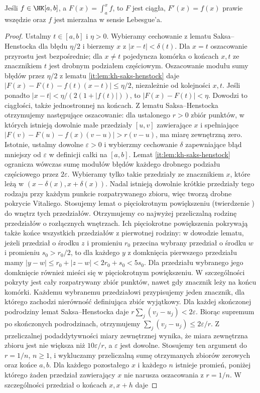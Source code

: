 \begin{twierdzenie}\label{ma1:kh:thm:kh-primitive-derivative}\label{it:thm:kh-primitive-derivative}
Jeśli $f\in\HK[a,b]$, a $F(x)=\int_a^x f$, to $F$ jest ciągła, $F'(x)=f(x)$ prawie wszędzie oraz $f$ jest mierzalna w sensie Lebesgue'a.
\end{twierdzenie}
\begin{proof}
Ustalmy $t\in[a,b]$ i $\eta>0$. Wybieramy cechowanie z lematu Saksa--Henstocka dla błędu $\eta/2$ i bierzemy $x$ z $|x-t|<\delta(t)$. Dla $x=t$ oszacowanie przyrostu jest bezpośrednie; dla $x\ne t$ pojedyncza komórka o końcach $x,t$ ze znacznikiem $t$ jest drobnym podziałem częściowym. Oszacowanie modułu sumy błędów przez $\eta/2$ z lematu \ref{it:lem:kh-saks-henstock} daje
$|F(x)-F(t)-f(t)(x-t)|\le\eta/2$, niezależnie od kolejności $x,t$. Jeśli ponadto $|x-t|<\eta/(2(1+|f(t)|))$, to $|F(x)-F(t)|<\eta$. Dowodzi to ciągłości, także jednostronnej na końcach. Z lematu Saksa--Henstocka otrzymujemy następujące oszacowanie: dla ustalonego $r>0$ zbiór punktów, w których istnieją dowolnie małe przedziały $[u,v]$ zawierające $x$ i spełniające $|F(v)-F(u)-f(x)(v-u)|>r(v-u)$, ma miarę zewnętrzną zero. Istotnie, ustalmy dowolne $\varepsilon>0$ i wybierzmy cechowanie $\delta$ zapewniające błąd mniejszy od $\varepsilon$ w definicji całki na $[a,b]$. Lemat \ref{it:lem:kh-saks-henstock} ogranicza wówczas sumę modułów błędów każdego drobnego podziału częściowego przez $2\varepsilon$. Wybieramy tylko takie przedziały ze znacznikiem $x$, które leżą w $(x-\delta(x),x+\delta(x))$. Nadal istnieją dowolnie krótkie przedziały tego rodzaju przy każdym punkcie rozpatrywanego zbioru, więc tworzą drobne pokrycie Vitaliego. Stosujemy lemat o pięciokrotnym powiększeniu (twierdzenie ) do wnętrz tych przedziałów. Otrzymujemy co najwyżej przeliczalną rodzinę przedziałów o rozłącznych wnętrzach. Ich pięciokrotne powiększenia pokrywają także końce wszystkich przedziałów z pierwotnej rodziny: w dowodzie lematu, jeżeli przedział o środku $z$ i promieniu $r_0$ przecina wybrany przedział o środku $w$ i promieniu $s_0>r_0/2$, to dla każdego $y$ z domknięcia pierwszego przedziału mamy $|y-w|\le r_0+|z-w|<2r_0+s_0<5s_0$. Dla przedziału wybranego jego domknięcie również mieści się w pięciokrotnym powiększeniu. W szczególności pokryty jest cały rozpatrywany zbiór punktów, nawet gdy znacznik leży na końcu komórki. Każdemu wybranemu przedziałowi przypisujemy jeden znacznik, dla którego zachodzi nierówność definiująca zbiór wyjątkowy. Dla każdej skończonej podrodziny lemat Saksa--Henstocka daje $r\sum_j(v_j-u_j)<2\varepsilon$. Biorąc supremum po skończonych podrodzinach, otrzymujemy $\sum_j(v_j-u_j)\le2\varepsilon/r$. Z przeliczalnej podaddytywności miary zewnętrznej wynika, że miara zewnętrzna zbioru jest nie większa niż $10\varepsilon/r$, a $\varepsilon$ jest dowolne. Stosujemy ten argument do $r=1/n$, $n\ge1$, i wykluczamy przeliczalną sumę otrzymanych zbiorów zerowych oraz końce $a,b$. Dla każdego pozostałego $x$ i każdego $n$ istnieje promień, poniżej którego żaden przedział zawierający $x$ nie narusza oszacowania z $r=1/n$. W szczególności przedział o końcach $x,x+h$ daje

\end{proof}
